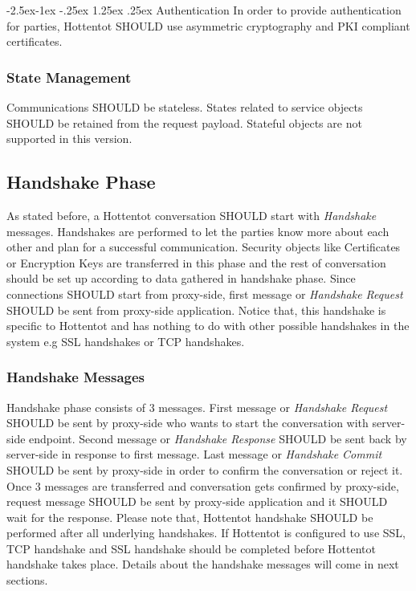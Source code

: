 \documentclass[10pt,a4paper]{article}
\makeatletter
\renewcommand\paragraph{\@startsection{paragraph}{4}{\z@}%
            {-2.5ex\@plus -1ex \@minus -.25ex}%
            {1.25ex \@plus .25ex}%
            {\normalfont\normalsize\bfseries}}
\makeatother
\begin{document}
\paragraph{Authentication}
In order to provide authentication for parties, Hottentot SHOULD use asymmetric cryptography and PKI compliant certificates.

\subsubsection{State Management}
Communications SHOULD be stateless. States related to service objects SHOULD be retained from the request payload. Stateful objects are not supported in this version.


\subsection{Handshake Phase}
As stated before, a Hottentot conversation SHOULD start with \textit{Handshake} messages. Handshakes are performed to let the parties know more about each other and plan for a successful communication. Security objects like Certificates or Encryption Keys are transferred in this phase and the rest of conversation should be set up according to data gathered in handshake phase. Since connections SHOULD start from proxy-side, first message or \textit{Handshake Request} SHOULD be sent from proxy-side application. Notice that, this handshake is specific to Hottentot and has nothing to do with other possible handshakes in the system e.g SSL handshakes or TCP handshakes.

\subsubsection{Handshake Messages}
Handshake phase consists of 3 messages. First message or \textit{Handshake Request} SHOULD be sent by proxy-side who wants to start the conversation with server-side endpoint. Second message or \textit{Handshake Response} SHOULD be sent back by server-side in response to first message. Last message or \textit{Handshake Commit} SHOULD be sent by proxy-side in order to confirm the conversation or reject it. Once 3 messages are transferred and conversation gets confirmed by proxy-side, request message SHOULD be sent by proxy-side application and it SHOULD wait for the response. Please note that, Hottentot handshake SHOULD be performed after all underlying handshakes. If Hottentot is configured to use SSL, TCP handshake and SSL handshake should be completed before Hottentot handshake takes place. Details about the handshake messages will come in next sections.
\end{document}
